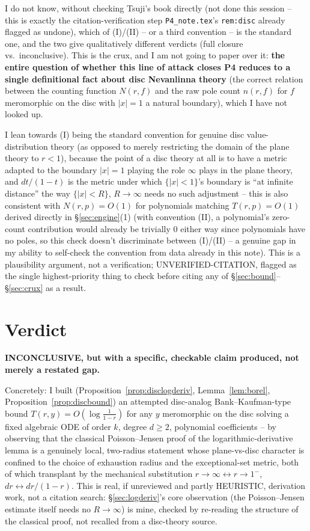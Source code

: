 \documentclass[11pt]{article}
\theoremstyle{remark}
\begin{document}
I do not know, without checking Tsuji's book directly (not done this session -- this is exactly
the citation-verification step \texttt{P4\_note.tex}'s \texttt{rem:disc} already flagged as
undone), which of (I)/(II) -- or a third convention -- is the standard one, and the two give
qualitatively different verdicts (full closure vs.\ inconclusive). This is the crux, and I am not
going to paper over it: \textbf{the entire question of whether this line of attack closes P4
reduces to a single definitional fact about disc Nevanlinna theory} (the correct relation between
the counting function $N(r,f)$ and the raw pole count $n(r,f)$ for $f$ meromorphic on the disc with
$|x|=1$ a natural boundary), which I have not looked up.

I lean towards (I) being the standard convention for genuine disc value-distribution theory (as
opposed to merely restricting the domain of the plane theory to $r<1$), because the point of a
disc theory at all is to have a metric adapted to the boundary $|x|=1$ playing the role $\infty$
plays in the plane theory, and $dt/(1-t)$ is the metric under which $\{|x|<1\}$'s boundary is
``at infinite distance'' the way $\{|x|<R\}$, $R\to\infty$ needs no such adjustment -- this is
also consistent with $N(r,p)=O(1)$ for polynomials matching $T(r,p)=O(1)$ derived directly in
\S\ref{sec:engine}(1) (with convention (II), a polynomial's zero-count contribution would already
be trivially $0$ either way since polynomials have no poles, so this check doesn't discriminate
between (I)/(II) -- a genuine gap in my ability to self-check the convention from data already in
this note). This is a plausibility argument, not a verification; UNVERIFIED-CITATION, flagged as
the single highest-priority thing to check before citing any of \S\ref{sec:bound}--\S\ref{sec:crux}
as a result.

\section*{Verdict}

\textbf{INCONCLUSIVE, but with a specific, checkable claim produced, not merely a restated gap.}

Concretely: I built (Proposition~\ref{prop:disclogderiv}, Lemma~\ref{lem:borel},
Proposition~\ref{prop:discbound}) an attempted disc-analog Bank--Kaufman-type bound
$T(r,y)=O(\log\frac1{1-r})$ for any $y$ meromorphic on the disc solving a fixed algebraic ODE of
order $k$, degree $d\ge2$, polynomial coefficients -- by observing that the classical
Poisson--Jensen proof of the logarithmic-derivative lemma is a genuinely local, two-radius
statement whose plane-vs-disc character is confined to the choice of exhaustion radius and the
exceptional-set metric, both of which transplant by the mechanical substitution
$r\to\infty\leftrightarrow r\to1^-$, $dr\leftrightarrow dr/(1-r)$. This is real, if unreviewed and
partly HEURISTIC, derivation work, not a citation search: \S\ref{sec:logderiv}'s core observation
(the Poisson--Jensen estimate itself needs no $R\to\infty$) is mine, checked by re-reading the
structure of the classical proof, not recalled from a disc-theory source.
\end{document}
